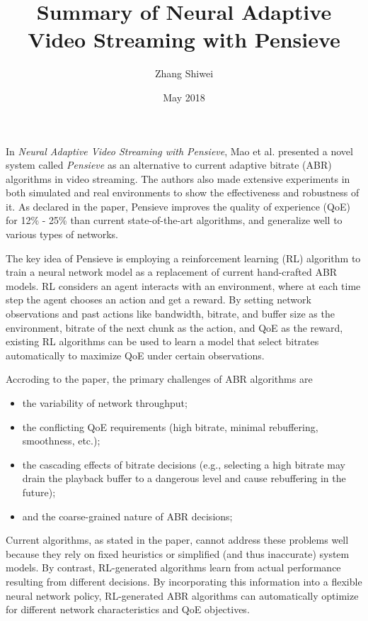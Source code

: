 \documentclass{manuscript}
\title{Summary of Neural Adaptive Video Streaming with Pensieve}
\author{Zhang Shiwei}
\date{May 2018}
\begin{document}
    \maketitle

    In \textit{Neural Adaptive Video Streaming with Pensieve}\cite{mao_neural_2017}, Mao et al. presented a novel system
    called \textit{Pensieve} as an alternative to current adaptive bitrate (ABR) algorithms in video streaming. The authors
    also made extensive experiments in both simulated and real environments to show the effectiveness and robustness of it.
    As declared in the paper, Pensieve improves the quality of experience (QoE) for 12\% - 25\% than current state-of-the-art
    algorithms, and generalize well to various types of networks.

    The key idea of Pensieve is employing a reinforcement learning (RL) algorithm to train a neural network model as a
    replacement of current hand-crafted ABR models. RL considers an agent interacts with an environment, where at each
    time step the agent chooses an action and get a reward. By setting network observations and past actions like
    bandwidth, bitrate, and buffer size as the environment, bitrate of the next chunk as the action, and QoE as the reward,
    existing RL algorithms can be used to learn a model that select bitrates automatically to maximize QoE under certain
    observations.

    Accroding to the paper, the primary challenges of ABR algorithms are
    \begin{itemize}[noitemsep, nolistsep]
        \item the variability of network throughput;
        \item the conflicting QoE requirements (high bitrate, minimal rebuffering, smoothness, etc.);
        \item the cascading effects of bitrate decisions (e.g., selecting a high bitrate may drain the playback buffer
        to a dangerous level and cause rebuffering in the future);
        \item and the coarse-grained nature of ABR decisions;
    \end{itemize}

    Current algorithms, as stated in the paper, cannot address these problems well because they rely on fixed heuristics
    or simplified (and thus inaccurate) system models. By contrast, RL-generated algorithms learn from actual performance
    resulting from different decisions. By incorporating this information into a flexible neural network policy, RL-generated
    ABR algorithms can automatically optimize for different network characteristics and QoE objectives.
\end{document}
